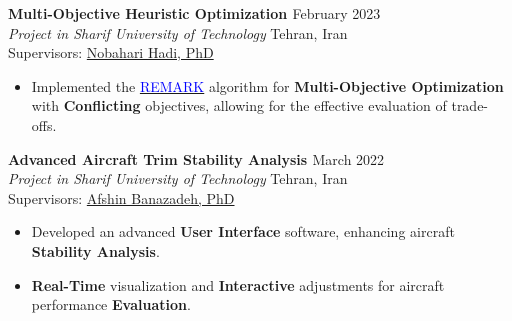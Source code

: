 \documentclass[12pt]{article}
\begin{document}
\vspace{-4pt}
\noindent
{\bfseries Multi-Objective Heuristic Optimization
\href{https://github.com/alibaniasad1999/Heuristic-optimization-algorithms}{\faGithub}
}
\hfill February 2023 \\
\noindent \textit{Project in Sharif University of Technology} \hfill Tehran, Iran \\
\noindent Supervisors:
\href{https://ae.sharif.edu/~portal/faculty/1091235256}{Nobahari Hadi, PhD}
\vspace{-8pt}
\begin{itemize} \itemsep -4pt %
    \item Implemented the \href{https://link.springer.com/article/10.1007/s12652-022-04332-8}{\textcolor{blue}{REMARK}} algorithm for \textbf{Multi-Objective Optimization} with \textbf{Conflicting} objectives, allowing for the effective evaluation of trade-offs.
\end{itemize}
\vspace{-4pt}
\noindent
{\bfseries Advanced Aircraft Trim Stability Analysis
\href{https://github.com/alibaniasad1999/DATCOM-Trim-Diagram-GUI}{\faGithub}
}
\hfill March 2022 \\
\noindent \textit{Project in Sharif University of Technology} \hfill Tehran, Iran \\
\noindent Supervisors:
\href{http://ae.sharif.edu/~portal/faculty/1014037799}{Afshin Banazadeh, PhD}
\vspace{-8pt}
\begin{itemize} \itemsep -4pt %
    \item Developed an advanced \textbf{User Interface} software, enhancing aircraft  \textbf{Stability Analysis}.
    \item  \textbf{Real-Time} visualization and \textbf{Interactive} adjustments for aircraft performance \textbf{Evaluation}.
\end{itemize}
\end{document}
